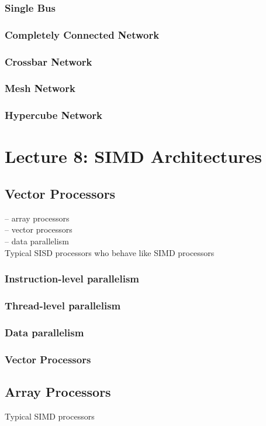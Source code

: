 \documentclass[titlepage, a4paper]{article}
\begin{document}
\subsubsection{Single Bus}
\subsubsection{Completely Connected Network}
\subsubsection{Crossbar Network}
\subsubsection{Mesh Network}
\subsubsection{Hypercube Network}

\section{Lecture 8: SIMD Architectures}

\subsection{Vector Processors}
-- array processors \\
-- vector processors \\
-- data parallelism \\
Typical SISD processors who behave like SIMD processors

\subsubsection{Instruction-level parallelism}
\subsubsection{Thread-level parallelism}
\subsubsection{Data parallelism}
\subsubsection{Vector Processors}
\subsection{Array Processors}
Typical SIMD processors
\end{document}
